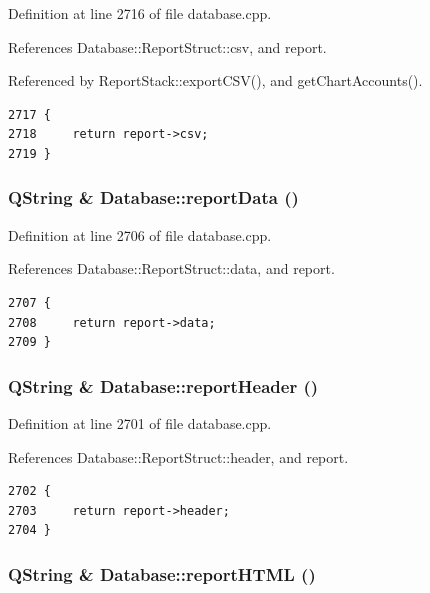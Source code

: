 Definition at line 2716 of file database.cpp.

References Database::Report\-Struct::csv, and report.

Referenced by Report\-Stack::export\-CSV(), and get\-Chart\-Accounts().

\footnotesize\begin{verbatim}2717 {
2718     return report->csv;
2719 }
\end{verbatim}\normalsize 


\hypertarget{classDatabase_a30}{
\subsubsection[reportData]{\setlength{\rightskip}{0pt plus 5cm}QString \& Database::report\-Data ()}}
\label{classDatabase_a30}


Definition at line 2706 of file database.cpp.

References Database::Report\-Struct::data, and report.

\footnotesize\begin{verbatim}2707 {
2708     return report->data;
2709 }
\end{verbatim}\normalsize 


\hypertarget{classDatabase_a29}{
\subsubsection[reportHeader]{\setlength{\rightskip}{0pt plus 5cm}QString \& Database::report\-Header ()}}
\label{classDatabase_a29}


Definition at line 2701 of file database.cpp.

References Database::Report\-Struct::header, and report.

\footnotesize\begin{verbatim}2702 {
2703     return report->header;
2704 }
\end{verbatim}\normalsize 


\hypertarget{classDatabase_a33}{
\subsubsection[reportHTML]{\setlength{\rightskip}{0pt plus 5cm}QString \& Database::report\-HTML ()}}
\label{classDatabase_a33}


